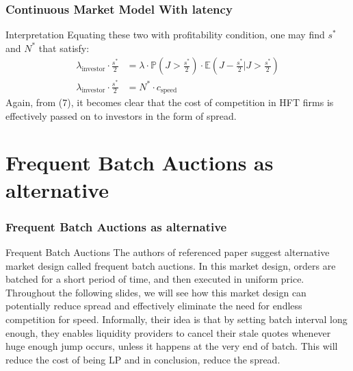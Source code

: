 \documentclass{beamer}
\begin{document}
\begin{frame}
    \frametitle{Continuous Market Model With latency}
    \begin{block}{Interpretation}
        Equating these two with profitability condition, one may find $s^*$ and $N^*$ that satisfy: \begin{align}
            \lambda_\text{investor} \cdot \frac{s^*}{2} &= \lambda \cdot \mathbb{P}(J > \frac{s^*}{2}) \cdot \mathbb{E}(J - \frac{s^*}{2} | J > \frac{s^*}{2}) \\
            \lambda_\text{investor} \cdot \frac{s^*}{2} &= N^* \cdot c_\text{speed}
        \end{align}
        Again, from (7), it becomes clear that the cost of competition in HFT firms is effectively passed on to investors in the form of spread.
    \end{block}
\end{frame}

\section{Frequent Batch Auctions as alternative}

\begin{frame}
    \frametitle{Frequent Batch Auctions as alternative}
    \begin{block}{Frequent Batch Auctions}
        The authors of referenced paper suggest alternative market design called frequent batch auctions. In this market design, orders are batched for a short period of time, and then executed in uniform price. Throughout the following slides, we will see how this market design can potentially reduce spread and effectively eliminate the need for endless competition for speed. Informally, their idea is that by setting batch interval long enough, they enables liquidity providers to cancel their stale quotes whenever huge enough jump occurs, unless it happens at the very end of batch. This will reduce the cost of being LP and in conclusion, reduce the spread.
    \end{block}
\end{frame}
\end{document}

